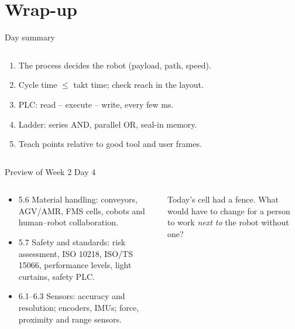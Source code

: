 \documentclass[aspectratio=169,10pt]{beamer}
\begin{document}
\section*{Wrap-up}
\begin{frame}[t]{Day summary}
\begin{columns}[T,onlytextwidth]
\centering
{}
\begin{keybox}
\small
\begin{enumerate}
\item The process decides the robot (payload, path, speed).
\item Cycle time $\le$ takt time; check reach in the layout.
\item PLC: read -- execute -- write, every few ms.
\item Ladder: series AND, parallel OR, seal-in memory.
\item Teach points relative to good tool and user frames.
\end{enumerate}
\end{keybox}
\end{columns}
\end{frame}

\begin{frame}[t]{Preview of Week 2 Day 4}
\begin{columns}[T,onlytextwidth]
\begin{defbox}
\small
\begin{itemize}
\item 5.6 Material handling: conveyors, AGV/AMR, FMS cells, cobots and human--robot collaboration.
\item 5.7 Safety and standards: risk assessment, ISO 10218, ISO/TS 15066, performance levels, light curtains, safety PLC.
\item 6.1--6.3 Sensors: accuracy and resolution; encoders, IMUs; force, proximity and range sensors.
\end{itemize}
\end{defbox}
\begin{keybox}
Today's cell had a fence. What would have to change for a person to work \emph{next to} the robot without one?
\end{keybox}
\end{columns}
\end{frame}
\end{document}
